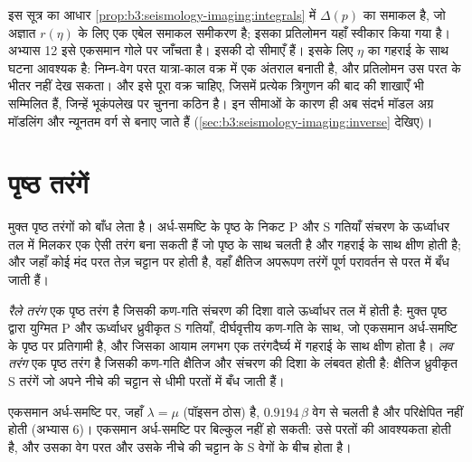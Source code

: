 इस सूत्र का आधार \cref{prop:b3:seismology-imaging:integrals} में $\Delta(p)$ का समाकल है,
जो अज्ञात $r(\eta)$ के लिए एक एबेल समाकल समीकरण है;
इसका प्रतिलोमन यहाँ स्वीकार किया गया है।
अभ्यास 12 इसे एकसमान गोले पर जाँचता है। इसकी दो सीमाएँ हैं। इसके लिए
$\eta$ का गहराई के साथ घटना आवश्यक है: निम्न-वेग परत यात्रा-काल वक्र में एक अंतराल बनाती है,
और प्रतिलोमन उस परत के भीतर नहीं देख सकता। और इसे पूरा वक्र चाहिए,
जिसमें प्रत्येक त्रिगुणन की बाद की शाखाएँ भी सम्मिलित हैं,
जिन्हें भूकंपलेख पर चुनना कठिन है। इन सीमाओं के कारण ही अब संदर्भ मॉडल
अग्र मॉडलिंग और न्यूनतम वर्ग से बनाए जाते हैं (\cref{sec:b3:seismology-imaging:inverse} देखिए)।

\section{पृष्ठ तरंगें}

मुक्त पृष्ठ तरंगों को बाँध लेता है। अर्ध-समष्टि के पृष्ठ के निकट P और S गतियाँ
संचरण के ऊर्ध्वाधर तल में मिलकर एक ऐसी तरंग बना सकती हैं जो पृष्ठ के साथ चलती है
और गहराई के साथ क्षीण होती है; और जहाँ कोई मंद परत तेज़ चट्टान पर होती है,
वहाँ क्षैतिज अपरूपण तरंगें पूर्ण परावर्तन से परत में बँध जाती हैं।

\begin{definition}[रैले तरंग, लव तरंग]\label{def:b3:seismology-imaging:surface-waves}
\emph{रैले तरंग} एक पृष्ठ तरंग है जिसकी कण-गति
संचरण की दिशा वाले ऊर्ध्वाधर तल में होती है: मुक्त पृष्ठ द्वारा युग्मित P
और ऊर्ध्वाधर ध्रुवीकृत S गतियाँ, दीर्घवृत्तीय कण-गति के साथ, जो एकसमान
अर्ध-समष्टि के पृष्ठ पर प्रतिगामी है, और जिसका आयाम लगभग एक तरंगदैर्घ्य में गहराई के साथ क्षीण होता है।
\emph{लव तरंग} एक पृष्ठ तरंग है
जिसकी कण-गति क्षैतिज और संचरण की दिशा के लंबवत होती है:
क्षैतिज ध्रुवीकृत S तरंगें
जो अपने नीचे की चट्टान से धीमी परतों में बँध जाती हैं।
\end{definition}

एकसमान अर्ध-समष्टि पर, जहाँ $\lambda = \mu$ (पॉइसन ठोस) है,  $0.9194\,\beta$ वेग से चलती है और परिक्षेपित नहीं होती (अभ्यास 6)। 
एकसमान अर्ध-समष्टि पर बिल्कुल नहीं हो सकती: उसे परतों की आवश्यकता होती है, और
उसका वेग परत और उसके नीचे की चट्टान के S वेगों के बीच होता है।

